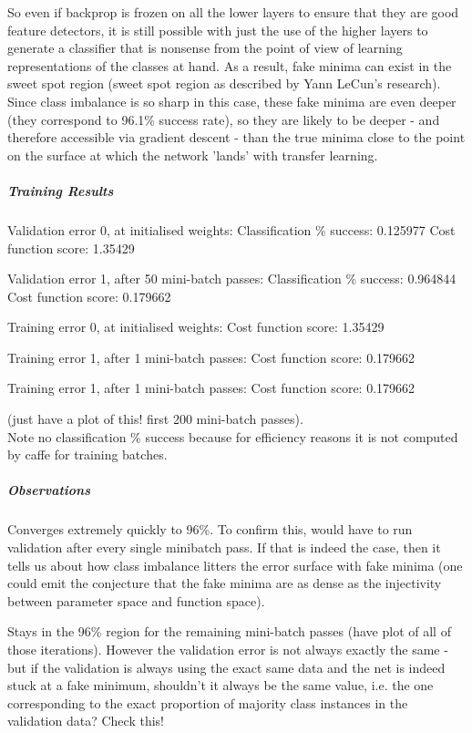 \documentclass[a4paper,11pt]{article}
\begin{document}
So even if backprop is frozen on all the lower layers to ensure that they are good feature detectors, it is still possible with just the use of the higher layers to generate a classifier that is nonsense from the point of view of learning representations of the classes at hand. As a result, fake minima can exist in the sweet spot region (sweet spot region as described by Yann LeCun's research). Since class imbalance is so sharp in this case, these fake minima are even deeper (they correspond to 96.1\% success rate), so they are likely to be deeper - and therefore accessible via gradient descent - than the true minima close to the point on the surface at which the network 'lands' with transfer learning. \\

\subparagraph{Training Results}

Validation error 0, at initialised weights:
Classification \% success: 0.125977
Cost function score: 1.35429

Validation error 1, after 50 mini-batch passes:
Classification \% success: 0.964844
Cost function score: 0.179662

Training error 0, at initialised weights:
Cost function score: 1.35429

Training error 1, after 1 mini-batch passes:
Cost function score: 0.179662

Training error 1, after 1 mini-batch passes:
Cost function score: 0.179662

(just have a plot of this! first 200 mini-batch passes). \\
Note no classification \% success because for efficiency reasons it is not computed by caffe for training batches.

\subparagraph{Observations}

Converges extremely quickly to 96\%. To confirm this, would have to run validation after every single minibatch pass. If that is indeed the case, then it tells us about how class imbalance litters the error surface with fake minima (one could emit the conjecture that the fake minima are as dense as the injectivity between parameter space and function space).

Stays in the 96\% region for the remaining mini-batch passes (have plot of all of those iterations). However the validation error is not always exactly the same - but if the validation is always using the exact same data and the net is indeed stuck at a fake minimum, shouldn't it always be the same value, i.e. the one corresponding to the exact proportion of majority class instances in the validation data? Check this!\\
\end{document}
